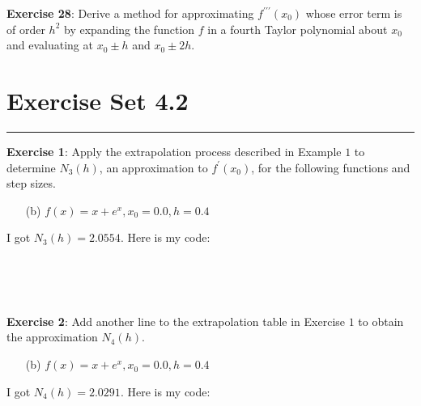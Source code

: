 \documentclass{article}
\begin{document}
\textbf{Exercise 28}: Derive a method for approximating $f^{\prime\prime\prime}(x_{0})$ whose error term is of order $h^{2}$ by expanding the function $f$ in a fourth Taylor polynomial about $x_{0}$ and evaluating at $x_{0} \pm h$ and $x_{0} \pm 2h$.

\newpage
\section*{Exercise Set 4.2}
\hrule

\textbf{Exercise 1}: Apply the extrapolation process described in Example $1$ to determine $N_{3}(h)$, an approximation to $f^{\prime}(x_{0})$, for the following functions and step sizes.
    \begin{itemize}
        \item [(b)] $f(x) = x + e^{x}, x_{0} = 0.0, h = 0.4$
    \end{itemize}
    \begin{answer}
        I got $N_{3}(h) = 2.0554$. Here is my code:
        \inputminted{matlab}{./code/Derivative/ThreePointEndpoint.m}
        \inputminted{matlab}{./code/Derivative/ThreePointMidpoint.m}
        \inputminted{matlab}{./code/Derivative/approxDerive.m}
        \inputminted{matlab}{./code/Extrapolation/Extrapolate.m}
        \inputminted{matlab}{./code/script2.m}
    \end{answer}

\textbf{Exercise 2}: Add another line to the extrapolation table in Exercise $1$ to obtain the approximation $N_{4}(h)$.
    \begin{itemize}
        \item [(b)] $f(x) = x + e^{x}, x_{0} = 0.0, h = 0.4$
    \end{itemize}
    \begin{answer}
        I got $N_{4}(h) = 2.0291$. Here is my code:
        \inputminted{matlab}{./code/Derivative/ThreePointEndpoint.m}
        \inputminted{matlab}{./code/Derivative/ThreePointMidpoint.m}
        \inputminted{matlab}{./code/Derivative/approxDerive.m}
        \inputminted{matlab}{./code/Extrapolation/Extrapolate.m}
        \inputminted{matlab}{./code/script3.m}
    \end{answer}
\end{document}
